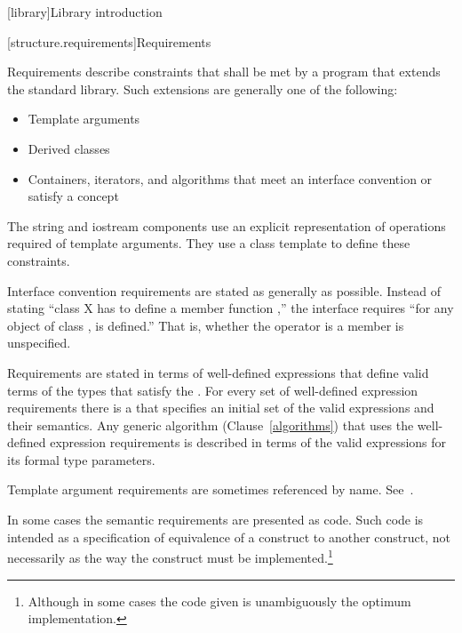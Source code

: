 \setcounter{chapter}{16}
[library]{Library introduction}

\setcounter{section}{5}
\setcounter{subsection}{1}
\setcounter{subsubsection}{2}

[structure.requirements]{Requirements}

\pnum
{}%
Requirements describe constraints that shall be met by a \Cpp program that extends the standard library.
Such extensions are generally one of the following:

\begin{itemize}
\item Template arguments
\item Derived classes
\item Containers, iterators, and algorithms that meet an interface convention
or satisfy a concept
\end{itemize}

\pnum
The string and iostream components use an explicit representation of operations
required of template arguments. They use a class template  to
define these constraints.

\pnum
Interface convention requirements are stated as generally as possible. Instead
of stating ``class X has to define a member function ,'' the
interface requires ``for any object  of class ,  is
defined.'' That is, whether the operator is a member is unspecified.

\pnum
Requirements are stated in terms of  well-defined expressions that define valid terms of
the types that satisfy the . For every set of
well-defined expression requirements there is a  that
specifies an initial set of the valid expressions and their semantics. Any generic
algorithm (Clause~\ref{algorithms}) that uses the well-defined expression requirements
is described in terms of the valid expressions for its formal type parameters. 

\pnum
Template argument requirements are sometimes referenced by name.
See~.

\pnum
In some cases the semantic requirements are presented as \Cpp code.
Such code is intended as a
specification of equivalence of a construct to another construct, not
necessarily as the way the construct
must be implemented.\footnote{Although in some cases the code given is
unambiguously the optimum implementation.}

